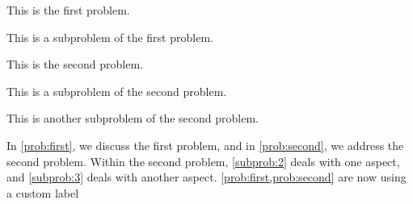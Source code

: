 \documentclass{hwcls}
\begin{document}
\tableofcontents

\label{prob:first}
This is the first problem.

\label{subprob:1}
This is a subproblem of the first problem.

\problem{}\label{prob:second}
This is the second problem.

\label{subprob:2}
This is a subproblem of the second problem.

\subproblem{}\label{subprob:3}
This is another subproblem of the second problem.

In \cref{prob:first}, we discuss the first problem, and in \cref{prob:second}, we address the second problem. Within the second problem, \cref{subprob:2} deals with one aspect, and \cref{subprob:3} deals with another aspect.
\begingroup
{}
\cref{prob:first,prob:second} are now using a custom label
\endgroup
\end{document}
